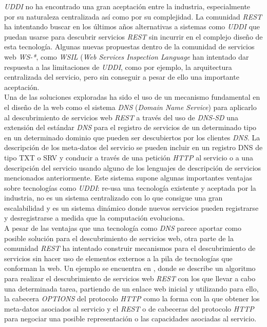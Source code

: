 \textit{UDDI} no ha encontrado una gran aceptaci\'on entre la industria, especialmente por su naturaleza centralizada as\'i como por su complejidad. La comunidad \textit{REST} ha intentando buscar en los \'ultimos a\~nos alternativas a sistemas como \textit{UDDI} que puedan usarse para descubrir servicios \textit{REST} sin incurrir en el complejo dise\~no de esta tecnolog\'ia. Algunas nuevas propuestas dentro de la comunidad de servicios web \textit{WS-*}, como \textit{WSIL} (\textit{Web Services Inspection Language} \cite{wsil} han intentado dar respuesta a las limitaciones de \textit{UDDI}, como por ejemplo, la arquitectura centralizada del servicio, pero sin conseguir a pesar de ello una importante aceptaci\'on.\\
Una de las soluciones exploradas ha sido el uso de un mecanismo fundamental en el dise\~no de la web como el sistema \textit{DNS} (\textit{Domain Name Service}) para aplicarlo al descubrimiento de servicios web \textit{REST} \cite{jara2012light} a trav\'es del uso de \textit{DNS-SD} una extensi\'on del est\'andar \textit{DNS} para el registro de servicios de un determinado tipo en un determinado dominio que pueden ser descubiertos por los clientes \textit{DNS}. La descripci\'on de los meta-datos del servicio se pueden incluir en un registro DNS de tipo TXT o SRV y conducir a trav\'es de una petici\'on \textit{HTTP} al servicio o a una descripci\'on del servicio usando alguno de los lenguajes de descripci\'on de servicios mencionados anteriormente. Este sistema supone algunas importantes ventajas sobre tecnolog\'ias como \textit{UDDI}: re-usa una tecnolog\'ia existente y aceptada por la industria, no es un sistema centralizado con lo que consigue una gran escalabilidad y es un sistema din\'amico donde nuevos servicios pueden registrarse y desregistrarse a medida que la computaci\'on evoluciona.\\
A pesar de las ventajas que una tecnolog\'ia como \textit{DNS} parece aportar como posible soluci\'on para el descubrimiento de servicios web, otra parte de la comunidad \textit{REST} ha intentado construir mecanismos para el descubrimiento de servicios sin hacer uso de elementos externos a la pila de tecnolog\'ias que conforman la web. Un ejemplo se encuentra en \cite{verborgh2011description}, donde se describe un algoritmo para realizar el descubrimiento de servicios web \textit{REST} con los que llevar a cabo una determinada tarea, partiendo de un enlace web inicial y utilizando para ello, la cabecera \textit{OPTIONS} del protocolo \textit{HTTP} como la forma con la que obtener los meta-datos asociados al servicio y el \textit{REST} o de cabeceras del protocolo \textit{HTTP} para negociar una posible representaci\'on o las capacidades asociadas al servicio.
